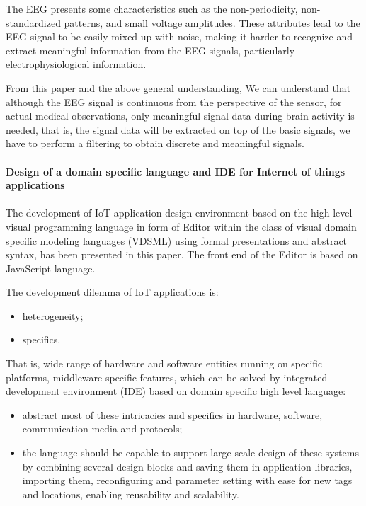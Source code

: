 \documentclass{article}
\begin{document}
The EEG presents some characteristics such as the non-periodicity, non-standardized patterns, and small voltage amplitudes. These attributes lead to the EEG signal to be easily mixed up with noise, making it harder to recognize and extract meaningful information from the EEG signals, particularly electrophysiological information. 

From this paper and the above general understanding, We can understand that although the EEG signal is continuous from the perspective of the sensor, for actual medical observations, only meaningful signal data during brain activity is needed, that is, the signal data will be extracted on top of the basic signals, we have to perform a filtering to obtain discrete and meaningful signals.

\paragraph{Design of a domain specific language and IDE for Internet of things applications} 

\paragraph{}

The development of IoT application design environment based on the high level visual programming language in form of Editor within the class of visual domain specific modeling languages (VDSML) using formal presentations and abstract syntax, has been presented in this paper. The front end of the Editor is based on JavaScript language\cite{ref5}.

The development dilemma of IoT applications is: 

\begin{itemize}
  \item heterogeneity; 
  \item specifics.
\end{itemize}

That is, wide range of hardware and software entities running on specific platforms, middleware specific features, which can be solved by integrated development environment (IDE) based on domain specific high level language:

\begin{itemize}
  \item abstract most of these intricacies and specifics in hardware, software, communication media and protocols; 
  \item the language should be capable to support large scale design of these systems by combining several design blocks and saving them in application libraries, importing them, reconfiguring and parameter setting with ease for new tags and locations, enabling reusability and scalability.
\end{itemize}
\end{document}
